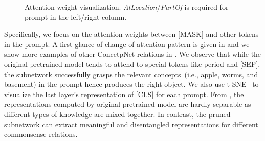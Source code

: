 \begin{figure}[t!]
	\centering
	\caption{Attention weight visualization. \textit{AtLocation}/\textit{PartOf} is required for prompt in the left/right column.} \label{fig:attention}
\end{figure}
Specifically, we focus on the attention weights between [MASK] and 
other tokens in the prompt. A first glance of change of attention pattern 
is given in  and we show more examples of other ConcetpNet 
relations in . We observe that while the original 
pretrained model tends to attend to special tokens like period and [SEP], 
the subnetwork successfully grasps the relevant concepts~(i.e., apple, 
worms, and basement) in the prompt hence produces the right object. 
We also use t-SNE~\citep{vanDerMaaten2008} to visualize the last layer's 
representation of [CLS] for each prompt. From , the 
representations computed by original pretrained model are hardly separable as 
different types of knowledge are mixed together. In contrast, the pruned 
subnetwork can extract meaningful and disentangled representations for 
different commonsense relations.




